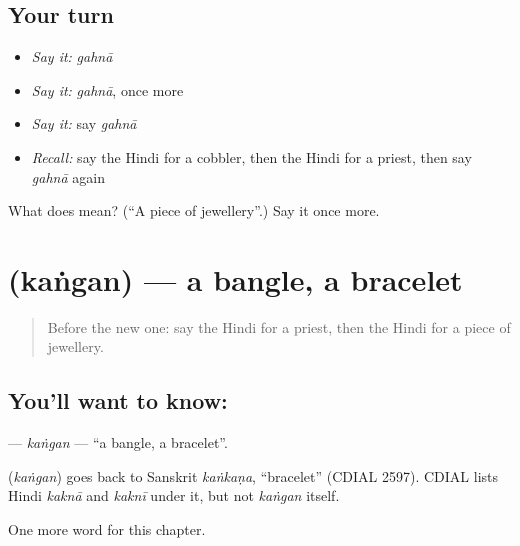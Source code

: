 \subsection*{Your turn}
\begin{itemize}
\raggedright
  \item \emph{Say it:} \emph{gahnā}
  \item \emph{Say it:} \emph{gahnā}, once more
  \item \emph{Say it:} say \emph{gahnā}
  \item \emph{Recall:} say the Hindi for a cobbler, then the Hindi for a priest, then say \emph{gahnā} again
\end{itemize}

\begin{tcolorbox}[breakable,colback=teal!4,colframe=teal!35!black,title={Before you move on}]
What does  mean? (\textquotedblleft{}A piece of jewellery\textquotedblright{}.) Say it once more.
\end{tcolorbox}
\section[\texorpdfstring{\hi{कंगन} (kaṅgan)}{कंगन (kaṅgan)}]{ (kaṅgan) — a bangle, a bracelet}

\label{lesson:HI-C262-kangan}



\begin{quote}
Before the new one: say the Hindi for a priest, then the Hindi for a piece of jewellery.
\end{quote}

\subsection*{You'll want to know: }
\textbf{} — \emph{kaṅgan} — \textquotedblleft{}a bangle, a bracelet\textquotedblright{}.

\begin{cousinweb}
\textbf{} (\emph{kaṅgan}) goes back to Sanskrit \emph{kaṅkaṇa}, \textquotedblleft{}bracelet\textquotedblright{} (CDIAL 2597). CDIAL lists Hindi \emph{kaknā} and \emph{kaknī} under it, but not \emph{kaṅgan} itself.
\end{cousinweb}

\begin{grammarlens}[title={What you've built}]
One more word for this chapter.
\end{grammarlens}

